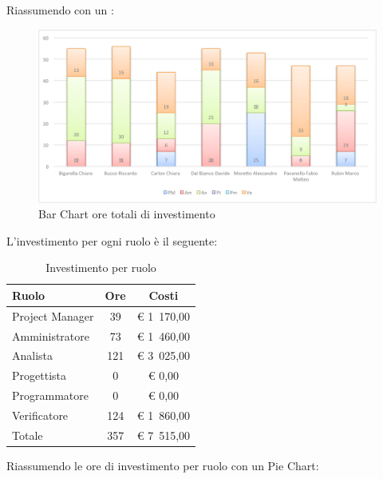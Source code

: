 				Riassumendo con un :
				\begin{figure}[H]\centering
					\includegraphics[width=\textwidth]{PianoDiProgetto/Pics/ChartOreInvest.pdf}
					\caption{Bar Chart ore totali di investimento}
				\end{figure}
				L'investimento per ogni ruolo è il seguente:
				\begin{table}[H]
					\begin{center}
						\begin{tabular}{| l | c | c |}
							\hline
							Ruolo 			& Ore 		& Costi  \\ \hline
							
							Project Manager	& 39 		& \euro{} 1~170,00 	\\
							Amministratore 		& 73 	& \euro{} 1~460,00 	\\
							Analista	 		& 121 	& \euro{} 3~025,00 	\\
							Progettista 		& 0		& \euro{} 0,00 	\\
							Programmatore		& 0		& \euro{} 0,00	\\
							Verificatore		& 124 	& \euro{} 1~860,00 	\\ \hline \hline
							
							Totale	 			& 357 	& \euro{} 7~515,00 	\\ \hline
						\end{tabular}
					\end{center}
					\caption{Investimento per ruolo}
				\end{table}
				Riassumendo le ore di investimento per ruolo con un Pie Chart:
